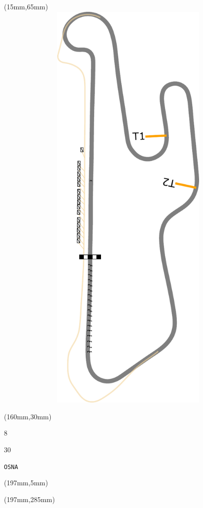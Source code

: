 \begin{textblock*}{185mm}(15mm,65mm)%
\centering
\mbox{\includegraphics[width=185mm,height=210mm,keepaspectratio]{PT/OSNA.pdf}}
\end{textblock*}
\begin{textblock*}{40mm}(160mm,30mm)%
\Large
\par{} 
\par8 
\par30 
\par\hfill\tiny\tt OSNA\\
\end{textblock*}
\begin{textblock*}{20mm}(197mm,5mm)%
\fbox{\thepage}
\label{OSNA}
\end{textblock*}
\begin{textblock*}{20mm}(197mm,285mm)%
\fbox{\thepage}
\end{textblock*}

